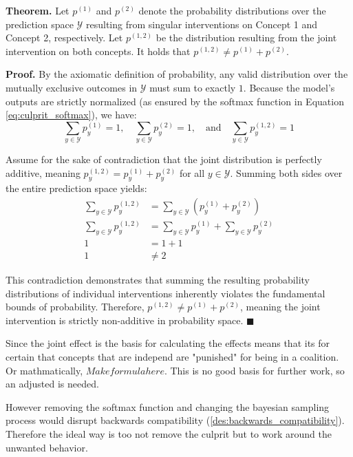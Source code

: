 \textbf{Theorem.} Let $p^{(1)}$ and $p^{(2)}$ denote the probability distributions over the prediction space $\mathcal{Y}$ resulting from singular interventions on Concept 1 and Concept 2, respectively. Let $p^{(1,2)}$ be the distribution resulting from the joint intervention on both concepts. It holds that $p^{(1,2)} \neq p^{(1)} + p^{(2)}$.

\textbf{Proof.} By the axiomatic definition of probability, any valid distribution over the mutually exclusive outcomes in $\mathcal{Y}$ must sum to exactly $1$. Because the model's outputs are strictly normalized (as ensured by the softmax function in Equation \ref{eq:culprit_softmax}), we have:
\begin{equation}
    \sum_{y \in \mathcal{Y}} p^{(1)}_y = 1, \quad \sum_{y \in \mathcal{Y}} p^{(2)}_y = 1, \quad \text{and} \quad \sum_{y \in \mathcal{Y}} p^{(1,2)}_y = 1
\end{equation}

Assume for the sake of contradiction that the joint distribution is perfectly additive, meaning $p^{(1,2)}_y = p^{(1)}_y + p^{(2)}_y$ for all $y \in \mathcal{Y}$. Summing both sides over the entire prediction space yields:
\begin{align}
    \sum_{y \in \mathcal{Y}} p^{(1,2)}_y &= \sum_{y \in \mathcal{Y}} \left( p^{(1)}_y + p^{(2)}_y \right) \\
    \sum_{y \in \mathcal{Y}} p^{(1,2)}_y &= \sum_{y \in \mathcal{Y}} p^{(1)}_y + \sum_{y \in \mathcal{Y}} p^{(2)}_y \\
    1 &= 1 + 1 \\
    1 &\neq 2
\end{align}

This contradiction demonstrates that summing the resulting probability distributions of individual interventions inherently violates the fundamental bounds of probability. Therefore, $p^{(1,2)} \neq p^{(1)} + p^{(2)}$, meaning the joint intervention is strictly non-additive in probability space. \hfill $\blacksquare$

Since the joint effect is the basis for calculating the effects means that its for certain that concepts that are independ are "punished" for being in a coalition. Or mathmatically, $Make formula here$. This is no good basis for further work, so an adjusted is needed.

However removing the softmax function and changing the bayesian sampling process would disrupt backwards compatibility (\ref{des:backwards_compatibility}). Therefore the ideal way is too not remove the culprit but to work around the unwanted behavior.

